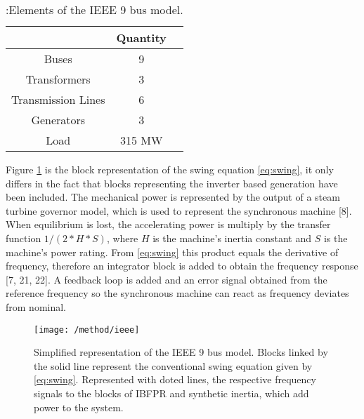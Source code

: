 \begin{table}[h]
	\caption{\label{tb:gridelements}:Elements of the IEEE 9 bus model.}
	\centering
	\begin{tabular}{ccc}
		\toprule
		\textbf{}	& \textbf{Quantity}\\
		\midrule
		Buses		& 9			\\
		Transformers		& 3			\\
 		Transmission Lines			& 6 \\
		Generators			& 3 \\
 		Load			&  315 MW  \\
		\bottomrule
	\end{tabular}
\end{table}





Figure \ref{fig:ieeesimple} is the block representation of the swing equation \eqref{eq:swing}, it only differs in the fact that blocks representing the inverter based generation have been included. The mechanical power is represented by the output of a steam turbine governor model, which is used to represent the synchronous machine [8]. When equilibrium is lost, the accelerating power is multiply by the transfer function $ 1/(2*H*S) $, where $ H $ is the machine’s inertia constant and $ S $ is the machine’s power rating. From \eqref{eq:swing} this product equals the derivative of frequency, therefore an integrator block is added to obtain the frequency response [7, 21, 22]. A feedback loop is added and an error signal obtained from the reference frequency so the synchronous machine can react as frequency deviates from nominal. \\ 

\begin{figure}[h]
	\centering
	\texttt{[image: /method/ieee]}
	\caption{Simplified representation of the IEEE 9 bus model. Blocks linked by the solid line represent the conventional swing equation given by \eqref{eq:swing}. Represented with doted lines, the respective frequency signals to the blocks of IBFPR and synthetic inertia, which add power to the system.}
	\label{fig:ieeesimple}
\end{figure}


